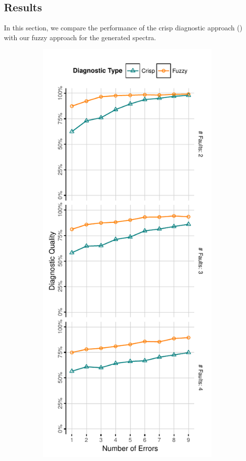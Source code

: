 \subsection{Results}
\label{sec:fuzzinel:benchmark:results}
In this section, we compare the performance of the crisp diagnostic
approach () with our fuzzy
approach for the generated spectra.
%
\begin{figure}[ht]
  \begin{center}
    \begin{subfigure}{0.43\columnwidth}
      \setlength{\fboxsep}{0em}
      \includegraphics[trim=0.6em 0.5em 2.2em 1em,clip=true]{figures/fuzzinel/figures/plot2.pdf}

\end{subfigure}
\end{center}
\end{figure}
